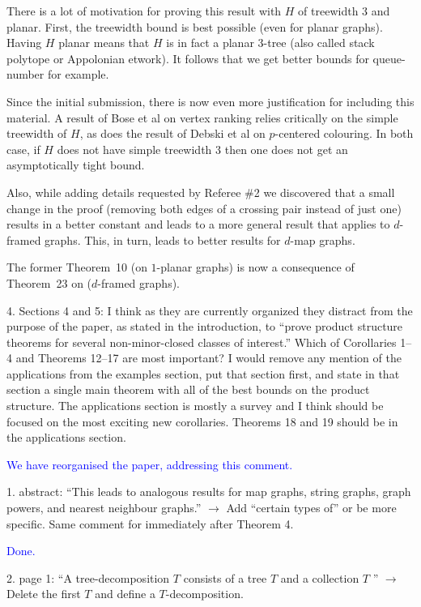 \documentclass[12pt]{article}
\newcommand{\done}{\textcolor{blue}{Done.}}
\newenvironment{response}{\color{blue}}{}
\begin{document}
\begin{response}
There is a lot of motivation for proving this result with $H$ of treewidth 3 and planar. First, the treewidth bound is best possible (even for planar graphs). Having $H$ planar means that $H$ is in fact a planar 3-tree (also called stack polytope or Appolonian etwork). It follows that we get better bounds for queue-number for example. 
	
Since the initial submission, there is now even more justification for including this material.  A result of Bose et al on vertex ranking relies critically on the simple treewidth of $H$, as does the result of Debski et al on $p$-centered colouring.  In both case, if $H$ does not have simple treewidth $3$ then one does not get an asymptotically tight bound.
  
Also, while adding details requested by Referee \#2 we discovered that a small change in the proof (removing both edges of a crossing pair instead of just one) results in a better constant and leads to a more general result that applies to $d$-framed graphs. This, in turn, leads to better results for $d$-map graphs.
  
The former Theorem~10 (on $1$-planar graphs) is now a consequence of  Theorem~23 on ($d$-framed graphs).
\end{response}


4. Sections 4 and 5: I think as they are currently organized they distract from the purpose of the paper, as stated in the introduction, to ``prove product structure theorems for several non-minor-closed classes of interest.'' Which of Corollaries 1--4 and Theorems 12--17 are most important? I would remove any mention of the applications from the examples section, put that section first, and state in that section a single main theorem with all of the best bounds on the product structure. The applications section is mostly a survey and I think should be focused on the most exciting new corollaries. Theorems 18 and 19 should be in the applications section.

\textcolor{blue}{We have reorganised the paper, addressing this comment. }

1. abstract: ``This leads to analogous results for map graphs, string graphs, graph powers, and nearest neighbour graphs.'' $\longrightarrow$
Add ``certain types of'' or be more specific. Same comment for immediately after Theorem 4.

\done

2. page 1: ``A tree-decomposition $T$ consists of a tree $T$ and a collection
$T$ '' $\longrightarrow$ Delete the first $T$ and define a $T$-decomposition.
\end{document}
